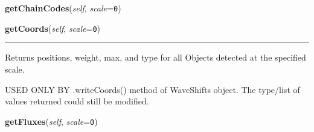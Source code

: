     \label{multireg:chipwavelets:Observation:getChainCodes}
    \vspace{0.5ex}

    \begin{boxedminipage}{\textwidth}

    \raggedright \textbf{getChainCodes}(\textit{self}, \textit{scale}=\texttt{0\-})

    \end{boxedminipage}

    \label{multireg:chipwavelets:Observation:getCoords}
    \vspace{0.5ex}

    \begin{boxedminipage}{\textwidth}

    \raggedright \textbf{getCoords}(\textit{self}, \textit{scale}=\texttt{0\-})

    \vspace{-1.5ex}

    \rule{\textwidth}{0.5\fboxrule}
    Returns positions, weight, max, and type for all Objects detected at 
    the specified scale.

    USED ONLY BY .writeCoords() method of WaveShifts object. The 
    type/list of values returned could still be modified.

    \vspace{1ex}

    \end{boxedminipage}

    \label{multireg:chipwavelets:Observation:getFluxes}
    \vspace{0.5ex}

    \begin{boxedminipage}{\textwidth}

    \raggedright \textbf{getFluxes}(\textit{self}, \textit{scale}=\texttt{0\-})

    \end{boxedminipage}

    \label{multireg:chipwavelets:Observation:getMoments}
    \vspace{0.5ex}

